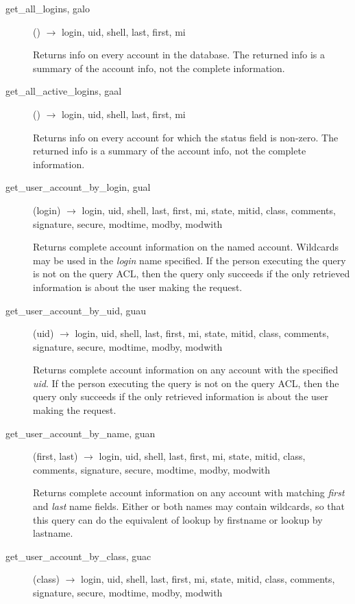 \begin{description}
\item[get\_all\_logins, galo]() $\rightarrow$ login, uid, shell, last, first, mi

Returns info on every account in the database.  The returned info is a
summary of the account info, not the complete information.

\item[get\_all\_active\_logins, gaal]() $\rightarrow$ login, uid, shell, last, first, mi

Returns info on every account for which the status field is non-zero.
The returned info is a summary of the account info, not the complete
information.

\item[get\_user\_account\_by\_login, gual](login) $\rightarrow$ login, uid,
shell, last, first, mi, state, mitid, class, comments, signature,
secure, modtime, modby, modwith

Returns complete account information on the named account.  Wildcards
may be used in the {\em login} name specified.  If the person executing
the query is not on the query ACL, then the query only succeeds if the
only retrieved information is about the user making the request.

\item[get\_user\_account\_by\_uid, guau](uid) $\rightarrow$ login, uid, shell,
last, first, mi, state, mitid, class, comments, signature, secure,
modtime, modby, modwith

Returns complete account information on any account with the specified
{\em uid}.  If the person executing the query is not on the query ACL,
then the query only succeeds if the only retrieved information is
about the user making the request.

\item[get\_user\_account\_by\_name, guan](first, last) $\rightarrow$ login, uid, shell,
last, first, mi, state, mitid, class, comments, signature, secure, modtime,
modby, modwith

Returns complete account information on any account with matching
{\em first} and {\em last} name fields.  Either or both names may contain
wildcards, so that this query can do the equivalent of lookup by
firstname or lookup by lastname.

\item[get\_user\_account\_by\_class, guac](class) $\rightarrow$ login, uid, shell, last,
first, mi, state, mitid, class, comments, signature, secure, modtime,
modby, modwith


\end{description}
